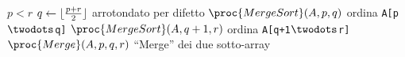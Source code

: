 \begin{codebox}
\li \If $p < r$
\li     \Then
            $q \gets \lfloor\frac{p + r}{2}\rfloor$ 
        \Comment arrotondato per difetto
\li         $\proc{MergeSort}(A,p,q)$
        \Comment ordina \texttt{A[p$\twodots$q]}
\li         $\proc{MergeSort}(A,q+1,r)$
        \Comment ordina \texttt{A[q+1$\twodots$r]}
\li         $\proc{Merge}(A,p,q,r)$
        \Comment ``Merge'' dei due sotto-array 
        \End
\end{codebox}